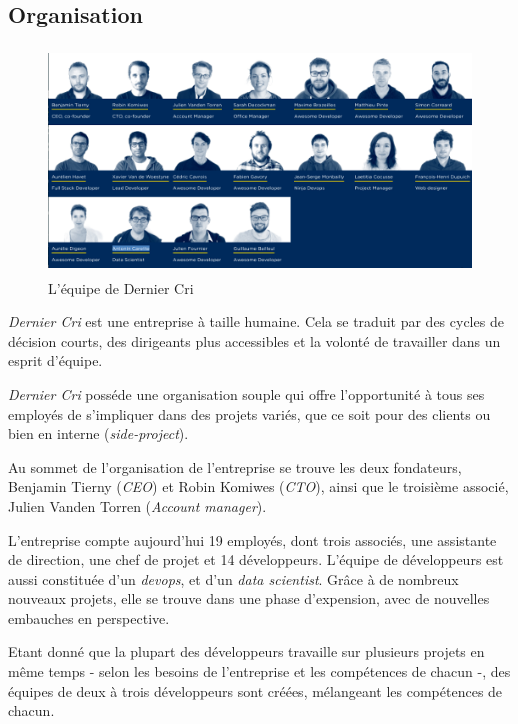 \bigskip

\subsection{Organisation}\label{organisation}

\begin{figure}[h]
  \centering
  \includegraphics[height=6cm]{figures/team.png}
  \caption{L'équipe de Dernier Cri}
\end{figure}

\bigskip

\emph{Dernier Cri} est une entreprise à taille humaine. Cela se traduit
par des cycles de décision courts, des dirigeants plus accessibles et la
volonté de travailler dans un esprit d'équipe.

\bigskip

\emph{Dernier Cri} posséde une organisation souple qui offre
l'opportunité à tous ses employés de s'impliquer dans des projets
variés, que ce soit pour des clients ou bien en interne
(\emph{side-project}).

\bigskip

Au sommet de l'organisation de l'entreprise se trouve les deux
fondateurs, Benjamin Tierny (\emph{CEO}) et Robin Komiwes (\emph{CTO}),
ainsi que le troisième associé, Julien Vanden Torren (\emph{Account
manager}).

\bigskip

L'entreprise compte aujourd'hui 19 employés, dont trois associés, une
assistante de direction, une chef de projet et 14 développeurs. L'équipe
de développeurs est aussi constituée d'un \emph{devops}, et d'un
\emph{data scientist}. Grâce à de nombreux nouveaux projets, elle se
trouve dans une phase d'expension, avec de nouvelles embauches en
perspective.

\bigskip

Etant donné que la plupart des développeurs travaille sur plusieurs
projets en même temps - selon les besoins de l'entreprise et les
compétences de chacun -, des équipes de deux à trois développeurs sont
créées, mélangeant les compétences de chacun.

